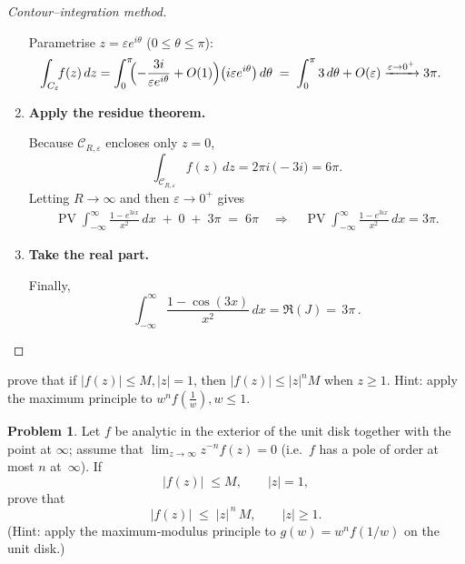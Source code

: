 \documentclass[12pt]{article}
\theoremstyle{definition} %
\newtheorem{problem}{Problem}
\theoremstyle{plain} %
\begin{document}
\begin{proof}[Contour–integration method]
\begin{enumerate}[label=\textup{(\roman*)},nosep]
  Parametrise $z=\varepsilon e^{i\theta}$ ($0\le\theta\le\pi$):
  \begin{align}
      \int_{C_\varepsilon}\!\!f(z)\,dz
      &=\int_{0}^{\pi}\!\!
        \Bigl(-\frac{3i}{\varepsilon e^{i\theta}}+O(1)\Bigr)
        \bigl(i\varepsilon e^{i\theta}\bigr)\,d\theta
        \;=\;
        \int_{0}^{\pi} 3\,d\theta + O(\varepsilon)
        \xrightarrow{\varepsilon\to0^{+}} 3\pi .
  \end{align}
  
  \item \textbf{Apply the residue theorem.}
  
  Because $\mathcal C_{R,\varepsilon}$ encloses only $z=0$,
  \[
      \int_{\mathcal C_{R,\varepsilon}}\!\!f(z)\,dz
      = 2\pi i\,\bigl(-3i\bigr)=6\pi .
  \]
  Letting $R\to\infty$ and then $\varepsilon\to0^{+}$ gives
  \begin{align}
      \operatorname*{PV}\!\int_{-\infty}^{\infty}
      \frac{1-e^{3ix}}{x^{2}}\,dx
      \;+\; 0
      \;+\; 3\pi
      \;=\;
      6\pi
      \quad\Longrightarrow\quad
      \operatorname*{PV}\!\int_{-\infty}^{\infty}
      \frac{1-e^{3ix}}{x^{2}}\,dx = 3\pi .
  \end{align}
  
  \item \textbf{Take the real part.}
  
  Finally,
  \[
      \int_{-\infty}^{\infty}\frac{1-\cos(3x)}{x^{2}}\,dx
      =\Re(J)=\boxed{\,3\pi\,}.
  \]
  \end{enumerate}
  \end{proof}

prove that if $\left\vert f(z) \right\vert \leq M, \left\vert z \right\vert =1$, then 
$\left\vert f(z) \right\vert \leq \left\vert z \right\vert ^{n} M $ when $z\geq 1$. Hint: apply the maximum principle to $w^{n}f(\frac{1}{w}), w \leq 1$.

\begin{problem}
  Let \(f\) be analytic in the exterior of the unit disk together with the point
  at \(\infty\); assume that \(\displaystyle\lim_{z\to\infty}z^{-n}f(z)=0\)
  (i.e.\ \(f\) has a pole of order at most \(n\) at~\(\infty\)).
  If
  \[
        |f(z)|\;\le M ,\qquad |z|=1 ,
  \]
  prove that
  \[
        |f(z)|\;\le\;|z|^{\,n}\,M ,\qquad |z|\ge1 .
  \]
  (Hint: apply the maximum‐modulus principle to
  \(g(w)=w^{n}f(1/w)\) on the unit disk.)
  \end{problem}
  
\end{document}
